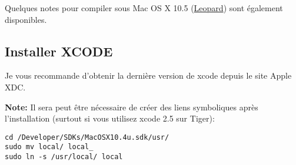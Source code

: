 Quelques notes pour compiler sous Mac OS X 10.5 (\underline{Leopard}) sont \'egalement disponibles.

% 
% 

\subsection{Installer XCODE}
Je vous recommande d'obtenir la derni\`ere version de xcode depuis le site Apple XDC.

\textbf{Note:} Il sera peut \^etre n\'ecessaire de cr\'eer des liens symboliques apr\`es l'installation (surtout si vous utilisez xcode 2.5 sur Tiger):

\begin{verbatim}
cd /Developer/SDKs/MacOSX10.4u.sdk/usr/
sudo mv local/ local_
sudo ln -s /usr/local/ local
\end{verbatim}

% 
% 
% 
% 


